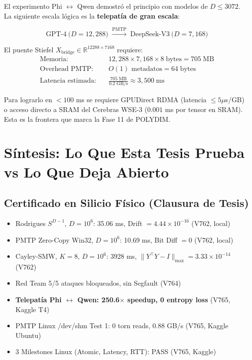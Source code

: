 El experimento Phi $\leftrightarrow$ Qwen demostró el principio con modelos de
$D \le 3072$. La siguiente escala lógica es la \textbf{telepatía de gran escala}:

\begin{equation}
  \mathrm{GPT\text{-}4\ (}D = 12{,}288\mathrm{)} \;\xrightarrow{\mathrm{PMTP}}\;
  \mathrm{DeepSeek\text{-}V3\ (}D = 7{,}168\mathrm{)}
\end{equation}

El puente Stiefel $X_{\text{bridge}} \in \mathbb{R}^{12288 \times 7168}$ requiere:
\begin{align}
  \text{Memoria}: &\quad 12{,}288 \times 7{,}168 \times 8\;\text{bytes} = 705\;\text{MB} \\
  \text{Overhead PMTP}: &\quad O(1) \text{ metadatos} = 64\;\text{bytes} \\
  \text{Latencia estimada}: &\quad \frac{705\;\text{MB}}{0.2\;\text{GB/s}} \approx 3{,}500\;\text{ms}
\end{align}

Para lograrlo en $< 100$ ms se requiere GPUDirect RDMA (latencia $\le 5\mu$s/GB)
o acceso directo a SRAM del Cerebras WSE-3 ($0.001$ ms por tensor en SRAM).
Esta es la frontera que marca la Fase 11 de POLYDIM.

\section{Síntesis: Lo Que Esta Tesis Prueba vs Lo Que Deja Abierto}

\subsection{Certificado en Silicio Físico (Clausura de Tesis)}

\begin{itemize}
  \item Rodrigues $S^{D-1}$, $D=10^6$: 35.06 ms, Drift $= 4.44\times10^{-16}$ (V762, local)
  \item PMTP Zero-Copy Win32, $D=10^6$: 10.69 ms, Bit Diff $= 0$ (V762, local)
  \item Cayley-SMW, $K=8$, $D=10^6$: 3928 ms, $\|Y^\top Y-I\|_{\max} = 3.33\times10^{-14}$ (V762)
  \item Red Team 5/5 ataques bloqueados, sin Segfault (V764)
  \item \textbf{Telepatía Phi $\leftrightarrow$ Qwen: 250.6$\times$ speedup, 0 entropy loss} (V765, Kaggle T4)
  \item PMTP Linux /dev/shm Test 1: 0 torn reads, 0.88 GB/s (V765, Kaggle Ubuntu)
  \item 3 Milestones Linux (Atomic, Latency, RTT): PASS (V765, Kaggle)
\end{itemize}

